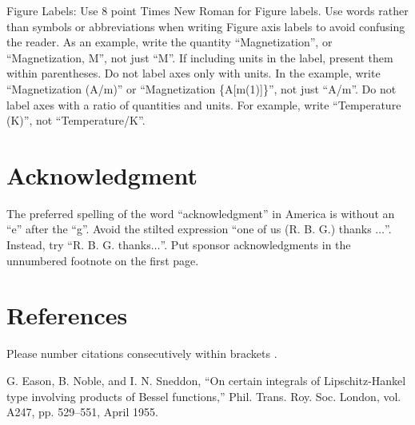 \documentclass[conference]{IEEEtran}
\begin{document}
Figure Labels: Use 8 point Times New Roman for Figure labels. Use words 
rather than symbols or abbreviations when writing Figure axis labels to 
avoid confusing the reader. As an example, write the quantity 
``Magnetization'', or ``Magnetization, M'', not just ``M''. If including 
units in the label, present them within parentheses. Do not label axes only 
with units. In the example, write ``Magnetization (A/m)'' or ``Magnetization 
\{A[m(1)]\}'', not just ``A/m''. Do not label axes with a ratio of 
quantities and units. For example, write ``Temperature (K)'', not 
``Temperature/K''.

\section*{Acknowledgment}

The preferred spelling of the word ``acknowledgment'' in America is without 
an ``e'' after the ``g''. Avoid the stilted expression ``one of us (R. B. 
G.) thanks $\ldots$''. Instead, try ``R. B. G. thanks$\ldots$''. Put sponsor 
acknowledgments in the unnumbered footnote on the first page.

\section*{References}

Please number citations consecutively within brackets \cite{b1}. 

\begin{thebibliography}{00}
 G. Eason, B. Noble, and I. N. Sneddon, ``On certain integrals of Lipschitz-Hankel type involving products of Bessel functions,'' Phil. Trans. Roy. Soc. London, vol. A247, pp. 529--551, April 1955.
\end{thebibliography}
\end{document}
